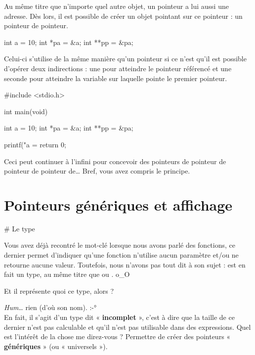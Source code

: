 Au même titre que n'importe quel autre objet, un pointeur a lui aussi
une adresse. Dès lors, il est possible de créer un objet pointant sur ce
pointeur : un pointeur de pointeur.

\begin{C}
int a = 10;
int *pa = &a;
int **pp = &pa;
\end{C}

Celui-ci s'utilise de la même manière qu'un pointeur si ce n'est qu'il
est possible d'opérer deux indirections : une pour atteindre le pointeur
référencé et une seconde pour atteindre la variable sur laquelle pointe
le premier pointeur.

\begin{C}
#include <stdio.h>


int main(void)
{
    int a = 10;
    int *pa = &a;
    int **pp = &pa;

    printf("a = %
    return 0;
}
\end{C}

\begin{infobox}
Ceci peut continuer à l'infini pour concevoir 
des pointeurs de pointeur de pointeur de pointeur de\ldots{}
Bref, vous avez compris le principe.
\end{infobox}

\section{Pointeurs génériques et affichage}
\label{pointeurs-generiques-et-affichage}

\# Le type 

Vous avez déjà recontré le mot-clé  lorsque nous avons
parlé des fonctions, ce dernier permet d'indiquer qu'une fonction
n'utilise aucun paramètre et/ou ne retourne aucune valeur. Toutefois,
nous n'avons pas tout dit à son sujet :  est en fait un
type, au même titre que  ou . o\_O

\begin{questionbox}
Et il représente quoi ce type, alors ?
\end{questionbox}


\emph{Hum}\ldots{} rien (d'où son nom). :-°\\
En fait, il s'agit d'un type dit « \textbf{incomplet} », c'est à dire
que la taille de ce dernier n'est pas calculable et qu'il n'est pas
utilisable dans des expressions. Quel est l'intérêt de la chose me
direz-vous ? Permettre de créer des pointeurs « \textbf{génériques} »
(ou « universels »).

